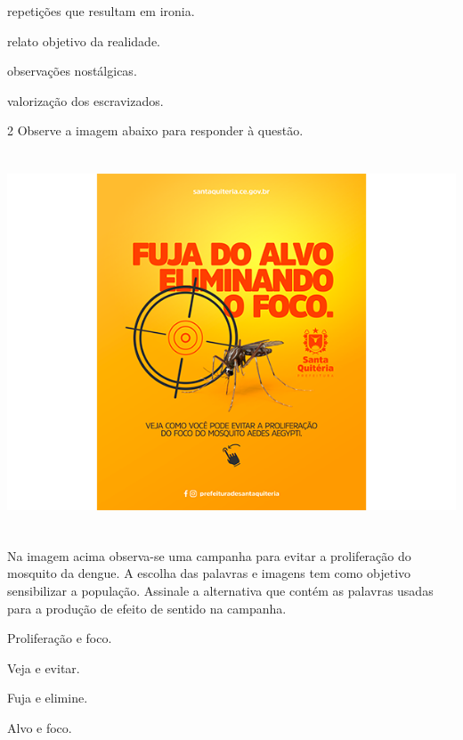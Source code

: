 \begin{escolha}

  \item repetições que resultam em ironia.
  
  \item relato objetivo da realidade.
  
  \item observações nostálgicas. 
  
  \item valorização dos escravizados. 

\end{escolha}


\num{2} Observe a imagem abaixo para responder à questão. 

\includegraphics[width=5.90551in,height=4.43056in]{./imgSAEB_7_POR/media/image6.png}


Na imagem acima observa-se uma campanha para evitar a proliferação do
mosquito da dengue. A escolha das palavras e imagens tem como objetivo
sensibilizar a população. Assinale a alternativa que contém as palavras
usadas para a produção de efeito de sentido na campanha. 

\begin{escolha}
  
  \item Proliferação e foco.
  
  \item Veja e evitar.
  
  \item Fuja e elimine.
  
  \item Alvo e foco. 

\end{escolha}


